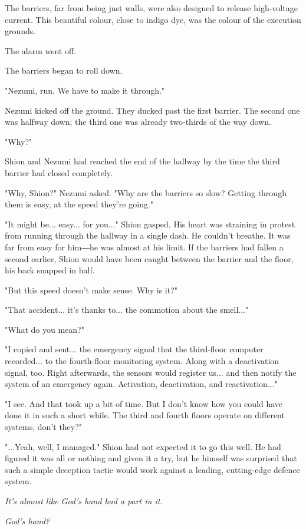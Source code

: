The barriers, far from being just walls, were also designed to release
high-voltage current. This beautiful colour, close to indigo dye, was
the colour of the execution grounds.

The alarm went off.

The barriers began to roll down.

"Nezumi, run. We have to make it through."

Nezumi kicked off the ground. They ducked past the first barrier. The
second one was halfway down; the third one was already two-thirds of the
way down.

"Why?"

Shion and Nezumi had reached the end of the hallway by the time the
third barrier had closed completely.

"Why, Shion?" Nezumi asked. "Why are the barriers so slow? Getting
through them is easy, at the speed they're going."

"It might be... easy... for you..." Shion gasped. His heart was
straining in protest from running through the hallway in a single dash.
He couldn't breathe. It was far from easy for him―he was almost at his
limit. If the barriers had fallen a second earlier, Shion would have
been caught between the barrier and the floor, his back snapped in half.

"But this speed doesn't make sense. Why is it?"

"That accident... it's thanks to... the commotion about the smell..."

"What do you mean?"

"I copied and sent... the emergency signal that the third-floor computer
recorded... to the fourth-floor monitoring system. Along with a
deactivation signal, too. Right afterwards, the sensors would register
us... and then notify the system of an emergency again. Activation,
deactivation, and reactivation..."

"I see. And that took up a bit of time. But I don't know how you could
have done it in such a short while. The third and fourth floors operate
on different systems, don't they?"

"...Yeah, well, I managed." Shion had not expected it to go this well.
He had figured it was all or nothing and given it a try, but he himself
was surprised that such a simple deception tactic would work against a
leading, cutting-edge defence system.

\emph{It's almost like God's hand had a part in it.}

\emph{God's hand?}

